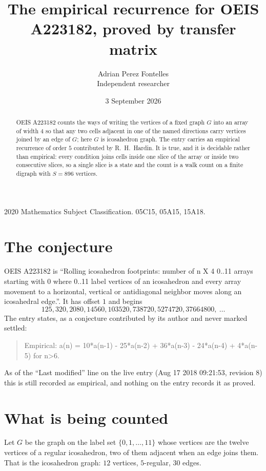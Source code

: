 \documentclass[11pt,a4paper]{article}
\title{The empirical recurrence for OEIS A223182, proved by transfer matrix}
\author{Adrian Perez Fontelles\\ \small Independent researcher}
\date{3 September 2026}
\theoremstyle{plain}
\theoremstyle{definition}
\begin{document}
\maketitle

\begin{abstract}
OEIS A223182 counts the ways of writing the vertices of a fixed graph $G$ into an array of width
$4$ so that any two cells adjacent in one of the named directions carry vertices joined by an
edge of $G$; here $G$ is icosahedron graph. The entry carries an empirical recurrence of order $5$
contributed by R.~H.~Hardin. It is true, and it is decidable rather than empirical: every
condition joins cells inside one slice of the array or inside two consecutive slices, so a
single slice is a state and the count is a walk count on a finite digraph with $S=896$ vertices.
\end{abstract}

\noindent\small 2020 Mathematics Subject Classification. 05C15, 05A15, 15A18.\normalsize

\section{The conjecture}

OEIS A223182 is ``Rolling icosahedron footprints: number of n X 4 0..11 arrays starting with 0 where 0..11 label vertices of an icosahedron and every array movement to a horizontal, vertical or antidiagonal neighbor moves along an icosahedral edge.''. It has offset $1$ and begins
\[
125, 320, 2080, 14560, 103520, 738720, 5274720, 37664800,\ \dots
\]
The entry states, as a conjecture contributed by its author and never marked settled:
\begin{quote}
Empirical: a(n) = 10*a(n-1) - 25*a(n-2) + 36*a(n-3) - 24*a(n-4) + 4*a(n-5) for n>6.
\end{quote}
As of the ``Last modified'' line on the live entry (Aug 17 2018 09:21:53, revision 8) this is still
recorded as empirical, and nothing on the entry records it as proved.

\section{What is being counted}

Let $G$ be the graph on the label set $\{0,1,\dots,11\}$ whose vertices are the twelve vertices of a regular icosahedron, two of them adjacent when an edge joins them. That is the icosahedron graph: $12$ vertices, $5$-regular, $30$ edges.
\end{document}
